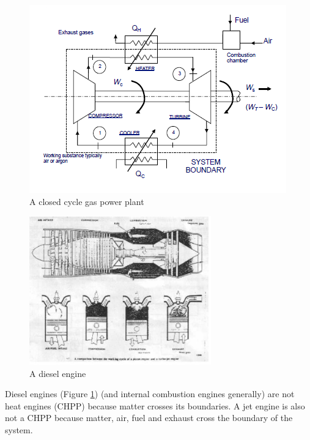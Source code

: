 \documentclass[class=report, crop=false, 12pt,a4paper]{standalone}
\begin{document}
\begin{figure}[H]
  \centering
    \includegraphics[width = \textwidth]{../img/ClosedCycleGasPP}
    \caption{A closed cycle gas power plant}
\end{figure}
\begin{figure}[H]
  \centering
    \includegraphics[width = 0.7\textwidth]{../img/DieselEngine}
    \caption{A diesel engine}
    \label{dieselengine}
\end{figure}
Diesel engines (Figure \ref{dieselengine}) (and internal combustion engines generally) are not heat engines (CHPP) because matter crosses its boundaries. A jet engine is also not a CHPP because matter, air, fuel and exhaust cross the boundary of the system.
\end{document}
